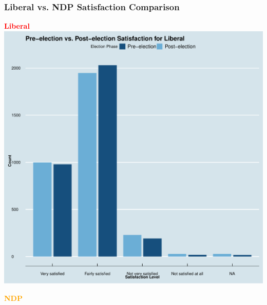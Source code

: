 \documentclass{beamer}
\begin{document}
\begin{frame}
    \frametitle{Liberal vs. NDP Satisfaction Comparison}
    \begin{center}
        \begin{minipage}{0.48\textwidth} %
            \centering
            \textbf{\textcolor{red}{Liberal}} \\ %
            \includegraphics[width=\textwidth]{Pre-election vs. Post-election Satisfaction for Liberal.pdf}
        \end{minipage}
        \hfill
        \begin{minipage}{0.48\textwidth} %
            \centering
            \textbf{\textcolor{orange}{NDP}} \\ %

\end{minipage}
\end{center}
\end{frame}
\end{document}
